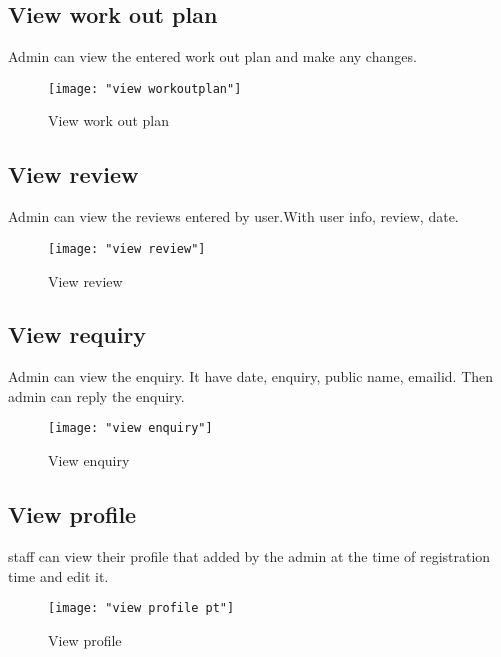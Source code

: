 \documentclass[a4paper,12pt,toc=flat]{report}
\begin{document}
{{	\subsection{View work out plan}
	 \hspace*{12pt} Admin can view the entered work out plan and make any changes.
	\begin{figure}[bph]
		\begin{center}
			\texttt{[image: "view workoutplan"]}
		\end{center}
		\caption{View work out plan}
	\end{figure}
	
	\pagebreak
	
	\subsection{View review}
	 \hspace*{12pt} Admin can view the reviews entered by user.With user info, review, date.
	\begin{figure}[bph]
		\begin{center}
			\texttt{[image: "view review"]}
		\end{center}
		\caption{View review}
	\end{figure}
	
	\subsection{View requiry}
	 \hspace*{12pt} Admin can view the enquiry. It have date, enquiry, public name, emailid. Then admin can reply the enquiry.
	\begin{figure}[bph]
		\begin{center}
			\texttt{[image: "view enquiry"]}
		\end{center}
		\caption{View enquiry}
	\end{figure}
	
	\pagebreak
	\subsection{View profile}
	 \hspace*{12pt} staff can view their profile that added by the admin at the time of registration time and edit it.
	\begin{figure}[bph]
		\begin{center}
			\texttt{[image: "view profile pt"]}
		\end{center}
		\caption{View profile}
	\end{figure}
	
}}
\end{document}
